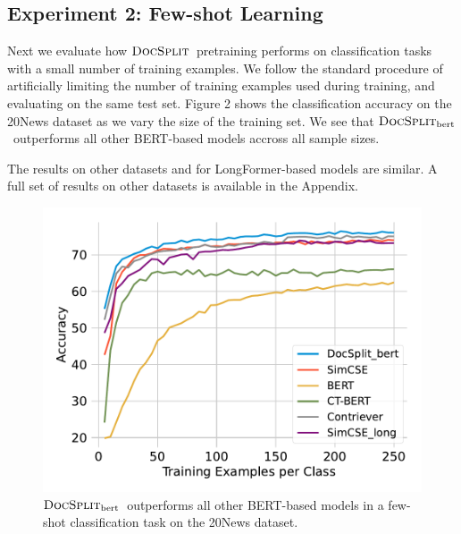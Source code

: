 \documentclass[11pt]{article}
\newcommand{\our}{\mbox{\textsc{DocSplit}}}
\newcommand{\ourbert}{$\our_{\mathrm{bert}}$}
\newcommand{\fixme}[1]{{\color{red}{FIXME: {#1}}}}
\begin{document}
\subsection{Experiment 2: Few-shot Learning}

Next we evaluate how $\our$~pretraining performs on classification tasks with a small number of training examples.
We follow the standard procedure of artificially limiting the number of training examples used during training,
and evaluating on the same test set.
Figure 2 shows the classification accuracy on the 20News dataset as we vary the size of the training set.
We see that \ourbert~outperforms all other BERT-based models accross all sample sizes.

The results on other datasets and for LongFormer-based models are similar.
A full set of results on other datasets is available in the Appendix.

\begin{figure}
\centering
\includegraphics[width=0.8\linewidth]{fig/few_shot.pdf}
\caption{
    \ourbert~outperforms all other BERT-based models in a few-shot classification task on the 20News dataset.
}
\label{few_shot}
\end{figure}

\end{document}
